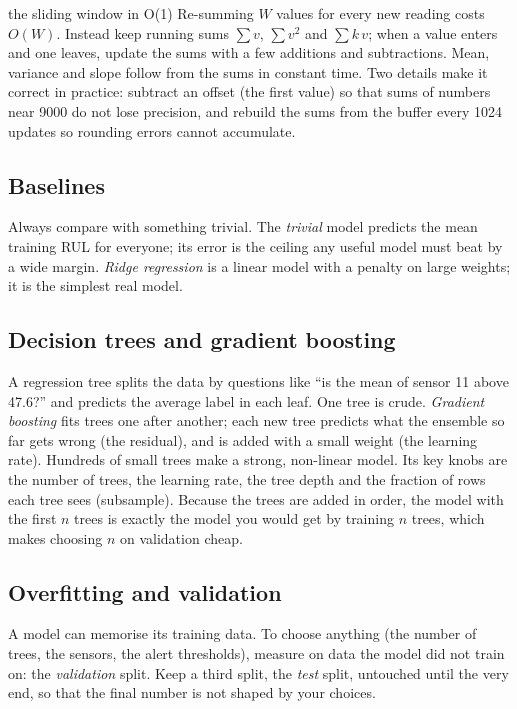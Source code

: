 \documentclass[11pt,a4paper]{article}
\begin{document}
\begin{keyidea}{the sliding window in O(1)}
Re-summing $W$ values for every new reading costs $O(W)$. Instead keep running sums $\sum v$, $\sum v^2$ and
$\sum k\,v$; when a value enters and one leaves, update the sums with a few additions and subtractions. Mean,
variance and slope follow from the sums in constant time. Two details make it correct in practice: subtract
an offset (the first value) so that sums of numbers near 9000 do not lose precision, and rebuild the sums from
the buffer every 1024 updates so rounding errors cannot accumulate.
\end{keyidea}

\subsection{Baselines}
Always compare with something trivial. The \emph{trivial} model predicts the mean training RUL for everyone;
its error is the ceiling any useful model must beat by a wide margin. \emph{Ridge regression} is a linear model
with a penalty on large weights; it is the simplest real model.

\subsection{Decision trees and gradient boosting}
A regression tree splits the data by questions like ``is the mean of sensor 11 above 47.6?'' and predicts the
average label in each leaf. One tree is crude. \emph{Gradient boosting} fits trees one after another; each new
tree predicts what the ensemble so far gets wrong (the residual), and is added with a small weight (the
learning rate). Hundreds of small trees make a strong, non-linear model. Its key knobs are the number of trees,
the learning rate, the tree depth and the fraction of rows each tree sees (subsample). Because the trees are
added in order, the model with the first $n$ trees is exactly the model you would get by training $n$ trees,
which makes choosing $n$ on validation cheap.

\subsection{Overfitting and validation}
A model can memorise its training data. To choose anything (the number of trees, the sensors, the alert
thresholds), measure on data the model did not train on: the \emph{validation} split. Keep a third split, the
\emph{test} split, untouched until the very end, so that the final number is not shaped by your choices.
\end{document}
